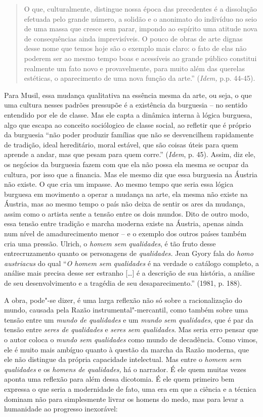 \begin{quote}
O que, culturalmente, distingue nossa época das precedentes é a
dissolução efetuada pelo grande número, a solidão e o anonimato do
indivíduo no seio de uma massa que cresce sem parar, impondo ao espírito
uma atitude nova de consequências ainda imprevisíveis. O pouco de obras
de arte dignas desse nome que temos hoje são o exemplo mais claro: o
fato de elas não poderem ser ao mesmo tempo boas e acessíveis ao grande
público constitui realmente um fato novo e provavelmente, para muito
além das querelas estéticas, o aparecimento de uma nova função da
arte.'' (\emph{Idem,} p.p. 44-45).
\end{quote}

Para Musil, essa mudança qualitativa na essência mesma da arte, ou seja,
o que uma cultura nesses padrões pressupõe é a existência da burguesia
-- no sentido entendido por ele de classe. Mas ele capta a dinâmica
interna à lógica burguesa, algo que escapa ao conceito sociólogico de classe
social, ao refletir que é próprio da burguesia ``não poder produzir famílias que
não se desvencilhem rapidamente de tradição, ideal hereditário, moral estável,
que são coisas úteis para quem aprende a andar, mas que pesam para quem
corre.'' (\emph{Idem}, p. 45). Assim, diz ele, os negócios da burguesia
fazem com que ela não possa ela mesma se ocupar da cultura, por isso que
a financia. Mas ele mesmo diz que essa burguesia na Áustria não existe.
O que cria um impasse. Ao mesmo tempo que seria essa lógica burguesa em
movimento a operar a mudança na arte, ela mesma não existe na Áustria,
mas ao mesmo tempo o país não deixa de sentir os ares da mudança, assim
como o artista sente a tensão entre os dois mundos. Dito de outro modo,
essa tensão entre tradição e marcha moderna existe na Áustria, apenas
ainda num nível de amadurecimento menor -- e o exemplo dos outros países
também cria uma pressão. Ulrich, o \emph{homem sem qualidades}, é tão
fruto desse entrecruzamento quanto os personagens de \emph{qualidades.}
Jean Gyory fala do \emph{homo austriacus} do qual ``\emph{O homem sem
qualidades} é na verdade o catálogo completo, a análise mais precisa
desse ser estranho [\ldots{}] é a descrição de sua história, a
análise de seu desenvolvimento e a tragédia de seu desaparecimento.''
(1981, p. 188).

A obra, pode"-se dizer, é uma larga reflexão não só sobre a
racionalização do mundo, causada pela Razão instrumental"-mercantil, como
também sobre uma tensão entre um \emph{mundo de qualidades} e um
\emph{mundo sem qualidades}, que é par da tensão entre \emph{seres de
qualidades} e \emph{seres sem qualidades}. Mas seria erro pensar que o
autor coloca o \emph{mundo sem qualidades} como mundo de decadência.
Como vimos, ele é muito mais ambíguo quanto à questão da marcha da Razão
moderna, que ele não distingue da própria capacidade intelectual. Mas
entre o \emph{homem sem qualidades} e os \emph{homens de qualidades,} há
o narrador. É ele quem muitas vezes aponta uma reflexão para além dessa
dicotomia. É ele quem primeiro bem expressa o que seria a modernidade de
fato, uma era em que a ciência e a técnica dominam não para simplesmente
livrar os homens do medo, mas para levar a humanidade ao progresso
inexorável:

